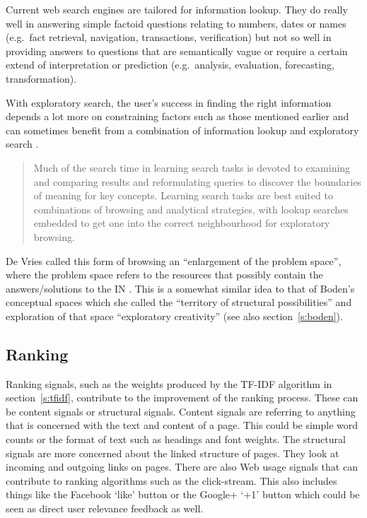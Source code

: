 Current web search engines are tailored for information lookup. They do really well in answering simple factoid questions relating to numbers, dates or names (e.g.\ fact retrieval, navigation, transactions, verification) but not so well in providing answers to questions that are semantically vague or require a certain extend of interpretation or prediction (e.g.\ analysis, evaluation, forecasting, transformation).

With exploratory search, the user’s success in finding the right information depends a lot more on constraining factors such as those mentioned earlier and can sometimes benefit from a combination of information lookup and exploratory search \autocite{Marchionini2006}.

\begin{quotation}
  Much of the search time in learning search tasks is devoted to examining and comparing results and reformulating queries to discover the boundaries of meaning for key concepts. Learning search tasks are best suited to combinations of browsing and analytical strategies, with lookup searches embedded to get one into the correct neighbourhood for exploratory browsing. 
\end{quotation}

De Vries called this form of browsing an ``enlargement of the problem space'', where the problem space refers to the resources that possibly contain the answers/solutions to the \ac{IN} \citeyear{DeVries1993}. This is a somewhat similar idea to that of Boden's conceptual spaces which she called the ``territory of structural possibilities'' and exploration of that space ``exploratory creativity'' \autocite{Boden2003} (see also section~\ref{s:boden}).



\subsection{Ranking}
\label{s:ranking}

Ranking signals, such as the weights produced by the \ac{TF}-\ac{IDF} algorithm in section~\ref{s:tfidf}, contribute to the improvement of the ranking process. These can be content signals or structural signals. Content signals are referring to anything that is concerned with the text and content of a page. This could be simple word counts or the format of text such as headings and font weights. The structural signals are more concerned about the linked structure of pages. They look at incoming and outgoing links on pages. There are also Web usage signals that can contribute to ranking algorithms such as the click-stream. This also includes things like the Facebook `like' button or the Google+ `+1' button which could be seen as direct user relevance feedback as well.

